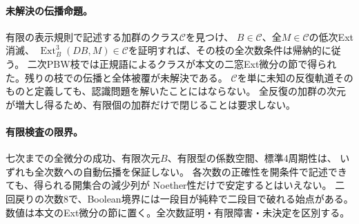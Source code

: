 \documentclass[11pt,a4paper]{ltjsarticle}
\begin{document}
\paragraph{未解決の伝播命題。}
有限の表示規則で記述する加群のクラス$\mathcal C$を見つけ、
$B\in\mathcal C$、全$M\in\mathcal C$の低次Ext消滅、
$\operatorname{Ext}_B^3(DB,M)\in\mathcal C$を証明すれば、その枝の全次数条件は帰納的に従う。
二次PBW枝では正規語によるクラスが本文の二窓Ext微分の節で得られた。残りの枝での伝播と全体被覆が未解決である。
$\mathcal C$を単に未知の反復軌道そのものと定義しても、認識問題を解いたことにはならない。
全反復の加群の次元が増大し得るため、有限個の加群だけで閉じることは要求しない。

\paragraph{有限検査の限界。}
七次までの全微分の成功、有限次元$B$、有限型の係数空間、標準4周期性は、
いずれも全次数への自動伝播を保証しない。
各次数の正確性を開条件で記述できても、得られる開集合の減少列が
Noether性だけで安定するとはいえない。
二回戻りの次数8で、Boolean境界には一段目が純粋で二段目で破れる始点がある。数値は本文のExt微分の節に置く。全次数証明・有限障害・未決定を区別する。
\end{document}
